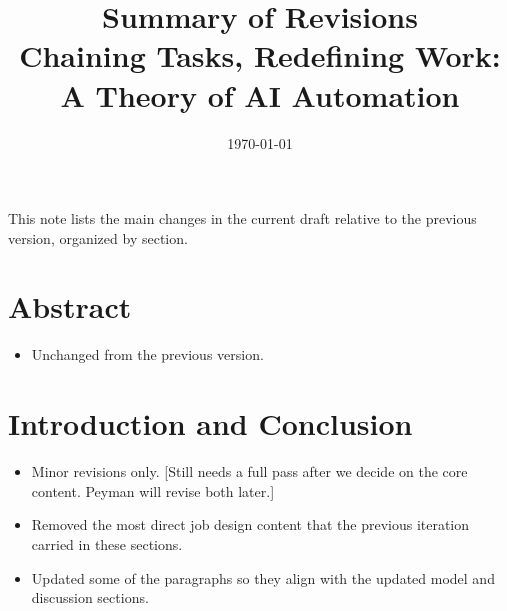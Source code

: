 \documentclass[11pt]{article}
\title{\textbf{Summary of Revisions}\\[0.35em]
\large Chaining Tasks, Redefining Work: A Theory of AI Automation}
\author{}
\date{\today}
\begin{document}
\maketitle
\vspace{-2.2em}

\noindent This note lists the main changes in the current draft relative to the previous version, organized by section.

\section*{Abstract}
\begin{itemize}
\item Unchanged from the previous version.
\end{itemize}

\section*{Introduction and Conclusion}
\begin{itemize}
\item Minor revisions only. [Still needs a full pass after we decide on the core content. Peyman will revise both later.]
\item Removed the most direct job design content that the previous iteration carried in these sections.
\item Updated some of the paragraphs so they align with the updated model and discussion sections.
\end{itemize}
\end{document}
